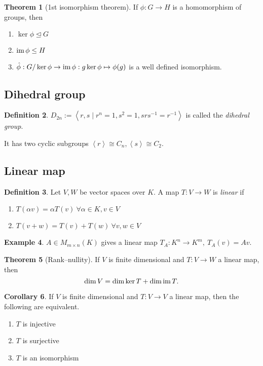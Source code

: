 \documentclass{article}
\newcommand{\la}{\left\langle}
\newcommand{\ra}{\right\rangle}
\newcommand{\im}{\text{im\,}}
\theoremstyle{definition}
\newtheorem{defn}{Definition}[subsection]
\newtheorem{thm}[defn]{Theorem}
\newtheorem{coro}[defn]{Corollary}
\newtheorem{example}[defn]{Example}
\begin{document}
\begin{thm}[1st isomorphism theorem]
If $\phi:G\rightarrow H$ is a homomorphism of groups, then
\begin{enumerate}
\item $\ker\phi\unlhd G$
\item $\im\phi\leq H$
\item $\hat\phi:G/\ker\phi\rightarrow\im\phi:g\ker\phi\mapsto\phi(g)$ is a well defined isomorphism.
\end{enumerate}
\end{thm}

\subsection{Dihedral group}
\begin{defn}
$D_{2n}:=\la r,s\mid r^n=1,s^2=1,srs^{-1}=r^{-1}\ra$ is called the \textit{dihedral group}.

It has two cyclic subgroups $\la r\ra\cong C_n,\la s\ra\cong C_2$.
\end{defn}

\subsection{Linear map}
\begin{defn}
Let $V,W$ be vector spaces over $K$. A map $T:V\rightarrow W$ is \textit{linear} if
\begin{enumerate}
\item $T(\alpha v)=\alpha T(v) \ \forall \alpha\in K,v\in V$
\item $T(v+w)=T(v)+T(w) \ \forall v,w\in V$
\end{enumerate}
\end{defn}

\begin{example}
$A\in M_{m\times n}(K)$ gives a linear map $T_A:K^n\rightarrow K^m,\ T_A(v)=Av$.
\end{example}

\begin{thm}[Rank–nullity]
\label{thm:rank-nullity}
If $V$ is finite dimensional and $T:V\rightarrow W$ a linear map, then
\[
\dim V=\dim\ker T+\dim\im T.
\]
\end{thm}

\begin{coro}
\label{coro:injequivsurjlinmapoverfindimV}
If $V$ is finite dimensional and $T:V\rightarrow V$ a linear map, then the following are equivalent.
\begin{enumerate}
\item $T$ is injective
\item $T$ is surjective
\item $T$ is an isomorphism
\end{enumerate}
\end{coro}
\end{document}
